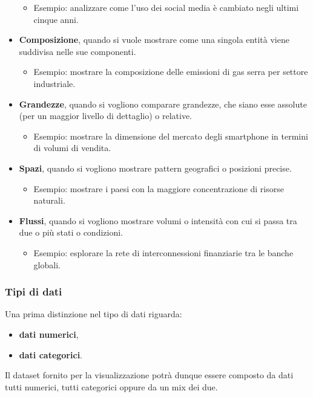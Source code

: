 \begin{itemize}
\begin{itemize}
        \item Esempio: analizzare come l'uso dei social media è cambiato negli ultimi cinque anni.
    \end{itemize}
    \item \textbf{Composizione}, quando si vuole mostrare come una singola entità viene suddivisa nelle sue componenti.
    \begin{itemize}
        \item Esempio: mostrare la composizione delle emissioni di gas serra per settore industriale.
    \end{itemize}
    \item \textbf{Grandezze}, quando si vogliono comparare grandezze, che siano esse assolute (per un maggior livello di dettaglio) o relative. 
    \begin{itemize}
        \item Esempio: mostrare la dimensione del mercato degli smartphone in termini di volumi di vendita.
    \end{itemize}
    \item \textbf{Spazi}, quando si vogliono mostrare pattern geografici o posizioni precise.
    \begin{itemize}
        \item Esempio: mostrare i paesi con la maggiore concentrazione di risorse naturali.
    \end{itemize}
    \item \textbf{Flussi}, quando si vogliono mostrare volumi o intensità con cui si passa tra due o più stati o condizioni.
    \begin{itemize}
        \item Esempio: esplorare la rete di interconnessioni finanziarie tra le banche globali.
    \end{itemize}
\end{itemize}

\subsubsection{Tipi di dati}
Una prima distinzione nel tipo di dati riguarda:
\begin{itemize}
    \item \textbf{dati numerici},
    \item \textbf{dati categorici}.
\end{itemize}
Il dataset fornito per la visualizzazione potrà dunque essere composto da dati tutti numerici, tutti categorici oppure da un mix dei due.

